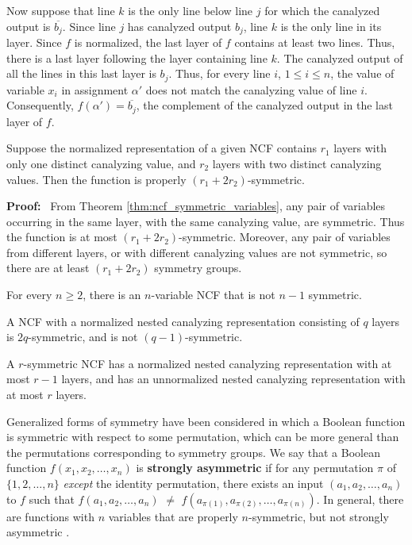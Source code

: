 Now suppose that line $k$ is the only line below line $j$ for which the canalyzed output is $\overline{b_j}$.
Since line $j$ has canalyzed output $b_j$, line $k$ is the only line in its layer.
Since $f$ is normalized, the last layer of $f$ contains at least two lines.
Thus, there is a last layer following the layer containing line $k$.
The canalyzed output of all the lines in this last layer is $b_j$.
Thus, for every line $i$, $1 \leq i \leq n$, 
the value of variable $x_i$ in assignment $\alpha'$ does not match the canalyzing value of line $i$.
Consequently, $f(\alpha') = \overline{b_j}$, the complement of the canalyzed output in the last layer of $f$.
\QED


\begin{theorem}\label{thm:ncf_r_symmetric}
Suppose the normalized representation of a given NCF contains 
$r_1$ layers with only one distinct canalyzing value,
and $r_2$ layers with two distinct canalyzing values.
Then the function is properly $(r_1 + 2 r_2)$-symmetric.
\end{theorem}
\noindent
\textbf{Proof:}~
From Theorem \ref{thm:ncf_symmetric_variables}, 
any pair of variables occurring in the same layer, with the same canalyzing value,
are symmetric.
Thus the function is at most $(r_1 + 2 r_2)$-symmetric.
Moreover, any pair of variables from different layers, or with different canalyzing values
are not symmetric, so there are at least $(r_1 + 2 r_2)$ symmetry groups.
\QED

\begin{corollary}\label{cor:ncf_not_rsymm}
For every $n \geq 2$, there is an $n$-variable NCF that is not $n-1$ symmetric.
\end{corollary}

\begin{corollary}\label{cor:ncf_r_symmetric_layers}
A NCF with a normalized nested canalyzing representation consisting of $q$ layers is $2q$-symmetric,
and is not $(q-1)$-symmetric.

A $r$-symmetric NCF has a normalized nested canalyzing representation with at most $r-1$ layers,
and has an unnormalized nested canalyzing representation with at most $r$ layers.
\end{corollary}

Generalized forms of symmetry have been considered \cite{KS-2000}
in which a Boolean function is symmetric with respect to some permutation,
which can be more general than the permutations corresponding to symmetry groups.
We say that a Boolean function $f(x_1, x_2, \ldots, x_n)$ 
is \textbf{strongly asymmetric}
if for any permutation $\pi$ of $\{1, 2, \ldots, n\}$
\emph{except} the identity permutation,
there exists an input $(a_1, a_2, \ldots,  a_n)$ 
to $f$ such that $f(a_1, a_2, \ldots, a_n)$ $\neq$  
$f(a_{\pi(1)}, a_{\pi(2)}, \ldots, a_{\pi(n)})$.
In general, there are functions with $n$ variables that are properly $n$-symmetric,
but not strongly asymmetric \cite{KS-2000}.

